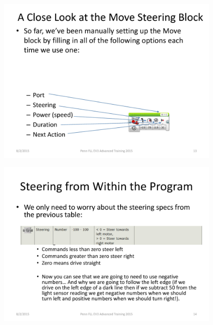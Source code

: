 \documentclass[11pt]{beamer}
\begin{document}
\begin{frame}
\begin{figure}
\includegraphics[scale=0.4]{ev3advanced2015/file-page13}
\end{figure}
\end{frame}


\begin{frame}
\begin{figure}
\includegraphics[scale=0.4]{ev3advanced2015/file-page14}
\end{figure}
\end{frame}
\end{document}
